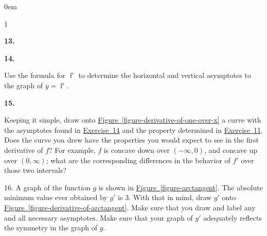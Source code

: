 \documentclass[12pt,]{book}
\theoremstyle{plain}
\theoremstyle{definition}
\numberwithin{equation}{section}
\newcounter{figstack}
\newlength\fight
\newcommand\pushValignCaptionBottom[5][b]{%
\stepcounter{figstack}%
\expandafter\def\csname %
figalign\romannumeral\value{figstack}\endcsname{#1}%
\expandafter\def\csname %
figtype\romannumeral\value{figstack}\endcsname{#2}%
\expandafter\def\csname %
figwd\romannumeral\value{figstack}\endcsname{#3}%
\expandafter\def\csname %
figcontent\romannumeral\value{figstack}\endcsname{#4}%
\expandafter\def\csname %
figcap\romannumeral\value{figstack}\endcsname{#5}%
\setbox0=\hbox{%
\begin{#2}{#3}#4\end{#2}}%
\ifdim\dimexpr\ht0+\dp0\relax>\fight\global\setlength{\fight}{%
\dimexpr\ht0+\dp0\relax}\fi%
}
\newenvironment{exercisegroup}%
{\medskip\noindent}%
{\par\bigskip}%
\newlength{\exercisegroupindent}%
\newlength{\exercisegroupitemwidth}%
\newenvironment{exercisegrouplist}%
{\vspace{-\partopsep}%
\begin{adjustwidth}{\exercisegroupindent}{0em}}%
{\end{adjustwidth}%
\vspace{-\partopsep}%
\vspace{\baselineskip}}%
\newenvironment{exercisegroupbycol}[1]%
{\begin{exercisegrouplist}%
\vspace{-\multicolsep}%
\begin{multicols}{#1}%
\setlength{\parindent}{0em}%
\setlength{\exercisegroupitemwidth}{\linewidth}}%
{\end{multicols}%
\vspace{-\multicolsep}%
\end{exercisegrouplist}}%
\newenvironment{exercisegroupitem}[1]%
{\begin{minipage}[t]{\exercisegroupitemwidth}
\vspace{0pt}%
{\bfseries#1}%
\rule{0pt}{\baselineskip}}{\strut%
\end{minipage}%
\hspace{\columnsep}}%
\providecommand\phantomsection{}
\newcommand{\fe}[2]{\mathop{{#1}{\left(#2\right)}}}
\newcommand{\ointerval}[2]{\left(#1,#2\right)}
\newcommand{\fd}[1]{#1'}
\begin{document}
\begin{exerciselist}
\begin{exercisegroup}
\begin{exercisegroupbycol}{1}
\begin{exercisegroupitem}{13. }
\end{exercisegroupitem}%
\par%
\begin{exercisegroupitem}{14. }\phantomsection\hypertarget{exercise-asymptotes-one-over-x}{\null}
Use the formula for \(\fe{\fd{f}}{x}\) to determine the horizontal and vertical asymptotes to the graph of \(y=\fe{\fd{f}}{x}\).%
\end{exercisegroupitem}%
\par%
\begin{exercisegroupitem}{15. }\phantomsection\hypertarget{exercise-167}{\null}
 Keeping it simple, draw onto \hyperref[figure-derivative-of-one-over-x]{Figure~\ref*{figure-derivative-of-one-over-x}} a curve with the asymptotes found in \hyperref[exercise-asymptotes-one-over-x]{Exercise~14} and the property determined in \hyperref[exercise-negative-derivative-of-one-over-x]{Exercise~11}. Does the curve you drew have the properties you would expect to see in the first derivative of \(f\)? For example, \(f\) is concave down over \(\ointerval{-\infty}{0}\), and concave up over \(\ointerval{0}{\infty}\); what are the corresponding differences in the behavior of \(\fd{f}\) over those two intervals?%
\end{exercisegroupitem}%
\par%
\end{exercisegroupbycol}%
\end{exercisegroup}%
\item[16.]\phantomsection\hypertarget{exercise-168}{\null}A graph of the function \(g\) is shown in \hyperref[figure-arctangent]{Figure~\ref*{figure-arctangent}}. The absolute minimum value ever obtained by \(\fd{g}\) is \(3\). With that in mind, draw \(\fd{g}\) onto \hyperref[figure-derivative-of-arctangent]{Figure~\ref*{figure-derivative-of-arctangent}}. Make sure that you draw and label any and all necessary asymptotes. Make sure that your graph of \(\fd{g}\) adequately reflects the symmetry in the graph of \(g\).%
\end{exerciselist}
\end{document}
